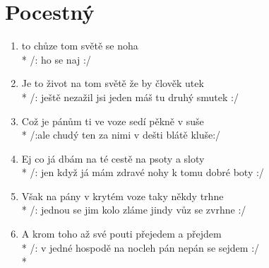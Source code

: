 \section{Pocestný}
\begin{enumerate}
\item {} to chůze  tom světě  se noha  \\*
/:    ho  se naj  :/ 
\item Je to život na tom světě že by člověk utek \\*
/: ještě nezažil jsi jeden máš tu druhý smutek :/ 
\item Což je pánům ti ve voze sedí pěkně v suše \\*
/:ale chudý ten za nimi v dešti blátě kluše:/ 
\item Ej co já dbám na té cestě na psoty a sloty \\*
/: jen když já mám zdravé nohy k tomu dobré boty :/ 
\item Však na pány v krytém voze taky někdy trhne \\*
/: jednou se jim kolo zláme jindy vůz se zvrhne :/ 
\item A krom toho až své pouti přejedem a přejdem \\*
/: v jedné hospodě na nocleh pán nepán se sejdem :/ \\*
\end{enumerate}
